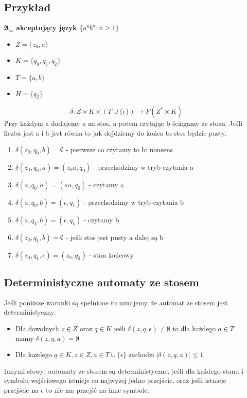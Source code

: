 \documentclass{../notatki}
\begin{document}
\subsection{Przykład}

\textbf{$\mathfrak{A}_{zs}$ akceptujący język $\{a^nb^n : n \ge 1\}$}

\begin{itemize}
  \item $Z = \{z_0, a\}$
  \item $K = \{q_0, q_1, q_2\}$
  \item $T = \{a, b\}$
  \item $H = \{q_2\}$
\end{itemize}

$$
\delta: Z \times K \times (T \cup \{\epsilon\}) \rightarrow P(Z^* \times K)
$$
Przy każdym a dodajemy a na stos, a potem czytając b ściagamy ze stosu. Jeśli
liczba jest a i b jest równa to jak dojdziemy do końca to stos będzie pusty.

\begin{enumerate}
  \item $\delta(z_0, q_0, b) = \emptyset$ - pierwsze co czytamy to b: nonsens
  \item $\delta(z_0, q_0, a) = (z_0a, q_0)$ - przechodzimy w tryb czytania a
  \item $\delta(a, q_0, a) = (aa, q_0)$ - czytamy a
  \item $\delta(a, q_0, b) = (\epsilon, q_1)$ - przechodzimy w tryb czytania b
  \item $\delta(a, q_1, b) = (\epsilon, q_1)$ - czytamy b
  \item $\delta(z_0, q_1, b) = \emptyset$ - jeśli stos jest pusty a dalej są b
  \item $\delta(z_0, q_1, \epsilon) = (z_0, q_2)$ - stan końcowy
\end{enumerate}

\subsection{Deterministyczne automaty ze stosem}

Jeśli poniższe warunki są spełnione to uznajemy, że automat ze stosem jest
deterministyczny:

\begin{itemize}
  \item Dla dowolnych $z \in Z$ oraz $q \in K$ jeśli $\delta(z, q,
    \epsilon) \ne \emptyset$ to dla każdego $a \in T$ mamy $\delta(z, q,
    a) = \emptyset$
  \item Dla każdego $q \in K, z \in Z, a \in T \cup \{\epsilon\}$ zachodzi
    $|\delta(z, q, a)| \le 1$
\end{itemize}
Innymi słowy: automaty ze stosem są deterministyczne, jeśli dla każdego
stanu i symbolu wejściowego istnieje co najwyżej jedno przejście, oraz jeśli
istnieje przejście na $\epsilon$ to nie ma przejść na inne symbole.
\end{document}
